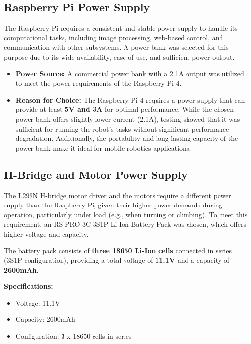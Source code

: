 \subsection{Raspberry Pi Power Supply}
The Raspberry Pi requires a consistent and stable power supply to handle its computational tasks, including image processing, web-based control, and communication with other subsystems. A power bank was selected for this purpose due to its wide availability, ease of use, and sufficient power output.

\begin{itemize}
	\item \textbf{Power Source:} A commercial power bank with a 2.1A output was utilized to meet the power requirements of the Raspberry Pi 4.
	
	\item \textbf{Reason for Choice:} The Raspberry Pi 4 requires a power supply that can provide at least \textbf{5V and 3A} for optimal performance. While the chosen power bank offers slightly lower current (2.1A), testing showed that it was sufficient for running the robot's tasks without significant performance degradation. Additionally, the portability and long-lasting capacity of the power bank make it ideal for mobile robotics applications.
	
\end{itemize}

\subsection{H-Bridge and Motor Power Supply}
The L298N H-bridge motor driver and the motors require a different power supply than the Raspberry Pi, given their higher power demands during operation, particularly under load (e.g., when turning or climbing). To meet this requirement, an RS PRO 3C 3S1P Li-Ion Battery Pack was chosen, which offers higher voltage and capacity.


The battery pack consists of \textbf{three 18650 Li-Ion cells} connected in series (3S1P configuration), providing a total voltage of \textbf{11.1V} and a capacity of \textbf{2600mAh}.
	
\textbf{Specifications:}
	\begin{itemize}
		\item Voltage: 11.1V
		\item Capacity: 2600mAh
		\item Configuration: 3 x 18650 cells in series
	\end{itemize}
	
